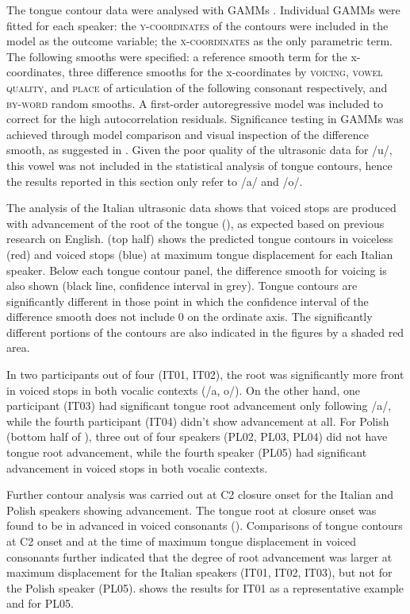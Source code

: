 \documentclass[authoryear, twocolumn]{elsarticle}
\begin{document}
The tongue contour data were analysed with GAMMs \citep{wood2006}.
Individual GAMMs were fitted for each speaker: the
\textsc{y-coordinates} of the contours were included in the model as the
outcome variable; the \textsc{x-coordinates} as the only parametric
term. The following smooths were specified: a reference smooth term for
the x-coordinates, three difference smooths for the x-coordinates by
\textsc{voicing}, \textsc{vowel quality}, and \textsc{place} of
articulation of the following consonant respectively, and
\textsc{by-word} random smooths. A first-order autoregressive model was
included to correct for the high autocorrelation residuals. Significance
testing in GAMMs was achieved through model comparison and visual
inspection of the difference smooth, as suggested in
\citep{soskuthy2017}. Given the poor quality of the ultrasonic data for
/u/, this vowel was not included in the statistical analysis of tongue
contours, hence the results reported in this section only refer to /a/
and /o/.

The analysis of the Italian ultrasonic data shows that voiced stops are
produced with advancement of the root of the tongue (), as expected
based on previous research on English.  (top half) shows the
predicted tongue contours in voiceless (red) and voiced stops (blue) at
maximum tongue displacement for each Italian speaker. Below each tongue
contour panel, the difference smooth for voicing is also shown (black
line, confidence interval in grey). Tongue contours are significantly
different in those point in which the confidence interval of the
difference smooth does not include 0 on the ordinate axis. The
significantly different portions of the contours are also indicated in
the figures by a shaded red area.

In two participants out of four (IT01, IT02), the root was significantly
more front in voiced stops in both vocalic contexts (/a, o/). On the
other hand, one participant (IT03) had significant tongue root
advancement only following /a/, while the fourth participant (IT04)
didn't show advancement at all. For Polish (bottom half of
), three out of four speakers (PL02, PL03, PL04) did not
have tongue root advancement, while the fourth speaker (PL05) had
significant advancement in voiced stops in both vocalic contexts.

Further contour analysis was carried out at C2 closure onset for the
Italian and Polish speakers showing advancement. The tongue root at
closure onset was found to be in advanced in voiced consonants ().
Comparisons of tongue contours at C2 onset and at the time of maximum
tongue displacement in voiced consonants further indicated that the
degree of root advancement was larger at maximum displacement for the
Italian speakers (IT01, IT02, IT03), but not for the Polish speaker
(PL05).  shows the results for IT01 as a representative
example and for PL05.
\end{document}
